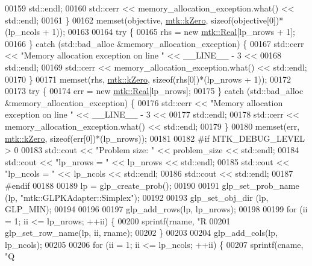 \begin{DoxyCode}
00159       std::endl;
00160     std::cerr << memory\_allocation\_exception.what() << std::endl;
00161   \}
00162   memset(objective, \hyperlink{group__c01-roots_ga59a451a5fae30d59649bcda274fea271}{mtk::kZero}, \textcolor{keyword}{sizeof}(objective[0])*(lp\_ncols + 1));
00163 
00164   \textcolor{keywordflow}{try} \{
00165     rhs = \textcolor{keyword}{new} \hyperlink{group__c01-roots_gac080bbbf5cbb5502c9f00405f894857d}{mtk::Real}[lp\_nrows + 1];
00166   \} \textcolor{keywordflow}{catch} (std::bad\_alloc &memory\_allocation\_exception) \{
00167     std::cerr << \textcolor{stringliteral}{"Memory allocation exception on line "} << \_\_LINE\_\_ - 3 <<
00168       std::endl;
00169     std::cerr << memory\_allocation\_exception.what() << std::endl;
00170   \}
00171   memset(rhs, \hyperlink{group__c01-roots_ga59a451a5fae30d59649bcda274fea271}{mtk::kZero}, \textcolor{keyword}{sizeof}(rhs[0])*(lp\_nrows + 1));
00172 
00173   \textcolor{keywordflow}{try} \{
00174     err = \textcolor{keyword}{new} \hyperlink{group__c01-roots_gac080bbbf5cbb5502c9f00405f894857d}{mtk::Real}[lp\_nrows];
00175   \} \textcolor{keywordflow}{catch} (std::bad\_alloc &memory\_allocation\_exception) \{
00176     std::cerr << \textcolor{stringliteral}{"Memory allocation exception on line "} << \_\_LINE\_\_ - 3 <<
00177       std::endl;
00178     std::cerr << memory\_allocation\_exception.what() << std::endl;
00179   \}
00180   memset(err, \hyperlink{group__c01-roots_ga59a451a5fae30d59649bcda274fea271}{mtk::kZero}, \textcolor{keyword}{sizeof}(err[0])*(lp\_nrows));
00181 
00182 \textcolor{preprocessor}{  #if MTK\_DEBUG\_LEVEL > 0}
00183   std::cout << \textcolor{stringliteral}{"Problem size: "} << problem\_size << std::endl;
00184   std::cout << \textcolor{stringliteral}{"lp\_nrows = "} << lp\_nrows << std::endl;
00185   std::cout << \textcolor{stringliteral}{"lp\_ncols = "} << lp\_ncols << std::endl;
00186   std::cout << std::endl;
00187 \textcolor{preprocessor}{  #endif}
00188 
00189   lp = glp\_create\_prob();
00190 
00191   glp\_set\_prob\_name (lp, \textcolor{stringliteral}{"mtk::GLPKAdapter::Simplex"});
00192 
00193   glp\_set\_obj\_dir (lp, GLP\_MIN);
00194 
00196 
00197   glp\_add\_rows(lp, lp\_nrows);
00198 
00199   \textcolor{keywordflow}{for} (ii = 1; ii <= lp\_nrows; ++ii) \{
00200     sprintf(rname, \textcolor{stringliteral}{"R%
00201     glp\_set\_row\_name(lp, ii, rname);
00202   \}
00203 
00204   glp\_add\_cols(lp, lp\_ncols);
00205 
00206   \textcolor{keywordflow}{for} (ii = 1; ii <= lp\_ncols; ++ii) \{
00207     sprintf(cname, \textcolor{stringliteral}{"Q%
}}
\end{DoxyCode}
